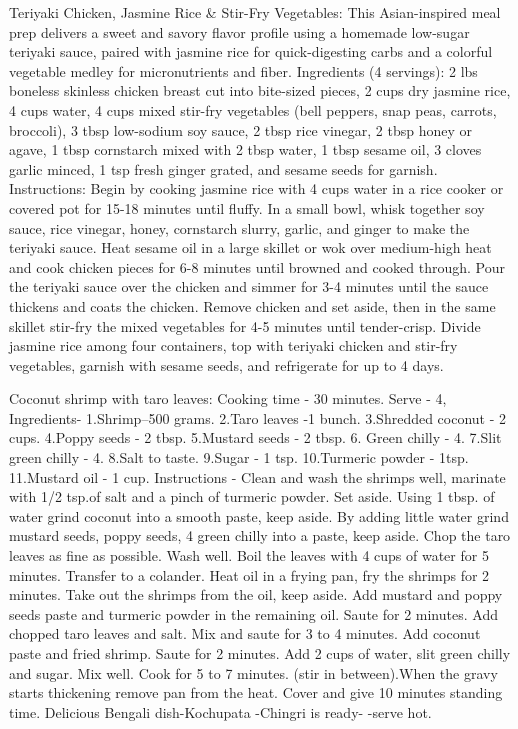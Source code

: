 Teriyaki Chicken, Jasmine Rice \& Stir-Fry Vegetables: This Asian-inspired meal prep delivers a sweet and savory flavor profile using a homemade low-sugar teriyaki sauce, paired with jasmine rice for quick-digesting carbs and a colorful vegetable medley for micronutrients and fiber. Ingredients (4 servings): 2 lbs boneless skinless chicken breast cut into bite-sized pieces, 2 cups dry jasmine rice, 4 cups water, 4 cups mixed stir-fry vegetables (bell peppers, snap peas, carrots, broccoli), 3 tbsp low-sodium soy sauce, 2 tbsp rice vinegar, 2 tbsp honey or agave, 1 tbsp cornstarch mixed with 2 tbsp water, 1 tbsp sesame oil, 3 cloves garlic minced, 1 tsp fresh ginger grated, and sesame seeds for garnish. Instructions: Begin by cooking jasmine rice with 4 cups water in a rice cooker or covered pot for 15-18 minutes until fluffy. In a small bowl, whisk together soy sauce, rice vinegar, honey, cornstarch slurry, garlic, and ginger to make the teriyaki sauce. Heat sesame oil in a large skillet or wok over medium-high heat and cook chicken pieces for 6-8 minutes until browned and cooked through. Pour the teriyaki sauce over the chicken and simmer for 3-4 minutes until the sauce thickens and coats the chicken. Remove chicken and set aside, then in the same skillet stir-fry the mixed vegetables for 4-5 minutes until tender-crisp. Divide jasmine rice among four containers, top with teriyaki chicken and stir-fry vegetables, garnish with sesame seeds, and refrigerate for up to 4 days.
\par

Coconut shrimp with taro leaves: Cooking time - 30 minutes. Serve - 4, Ingredients- 1.Shrimp--500 grams. 2.Taro leaves -1 bunch. 3.Shredded coconut - 2 cups. 4.Poppy seeds - 2 tbsp. 5.Mustard seeds - 2 tbsp. 6. Green chilly - 4. 7.Slit green chilly - 4. 8.Salt to taste. 9.Sugar - 1 tsp. 10.Turmeric powder - 1tsp. 11.Mustard oil - 1 cup. Instructions - Clean and wash the shrimps well, marinate with 1/2 tsp.of salt and a pinch of turmeric powder. Set aside. Using 1 tbsp. of water grind coconut into a smooth paste, keep aside. By adding little water grind mustard seeds, poppy seeds, 4 green chilly into a paste, keep aside. Chop the taro leaves as fine as possible. Wash well. Boil the leaves with 4 cups of water for 5 minutes. Transfer to a colander. Heat oil in a frying pan, fry the shrimps for 2 minutes. Take out the shrimps from the oil, keep aside. Add mustard and poppy seeds paste and turmeric powder in the remaining oil. Saute for 2 minutes. Add chopped taro leaves and salt. Mix and saute for 3 to 4 minutes. Add coconut paste and fried shrimp. Saute for 2 minutes. Add 2 cups of water, slit green chilly and sugar. Mix well. Cook for 5 to 7 minutes. (stir in between).When the gravy starts thickening remove pan from the heat. Cover and give 10 minutes standing time. Delicious Bengali dish-Kochupata -Chingri is ready- -serve hot.
\par

